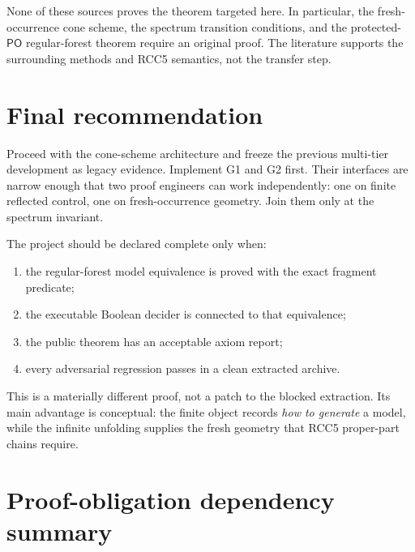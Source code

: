 \documentclass[11pt]{article}
\newcommand{\PO}{\mathsf{PO}}
\begin{document}
None of these sources proves the theorem targeted here. In particular, the
fresh-occurrence cone scheme, the spectrum transition conditions, and the protected-$\PO$
regular-forest theorem require an original proof. The literature supports the surrounding
methods and RCC5 semantics, not the transfer step.

\section{Final recommendation}

Proceed with the cone-scheme architecture and freeze the previous multi-tier development
as legacy evidence. Implement G1 and G2 first. Their interfaces are narrow enough that
two proof engineers can work independently: one on finite reflected control, one on
fresh-occurrence geometry. Join them only at the spectrum invariant.

The project should be declared complete only when:

\begin{enumerate}
  \item the regular-forest model equivalence is proved with the exact fragment predicate;
  \item the executable Boolean decider is connected to that equivalence;
  \item the public theorem has an acceptable axiom report;
  \item every adversarial regression passes in a clean extracted archive.
\end{enumerate}

This is a materially different proof, not a patch to the blocked extraction. Its main
advantage is conceptual: the finite object records \emph{how to generate} a model, while
the infinite unfolding supplies the fresh geometry that RCC5 proper-part chains require.

\appendix

\section{Proof-obligation dependency summary}
\end{document}

